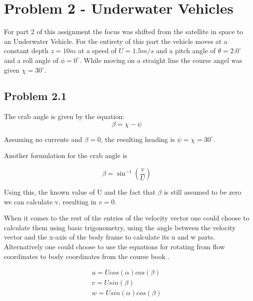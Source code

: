 \section*{Problem 2 - Underwater Vehicles}
For part 2 of this assignment the focus was shifted from the satellite in space to an Underwater Vehicle. For the entirety of this part the vehicle moves at a constant depth $z=10m$ at a speed of $U=1.5m/s$ and a pitch angle of $\theta = 2.0^\circ$ and a roll angle of $\phi = 0^\circ$. While moving on a straight line the course angel was given $\chi = 30^\circ$.
\subsection*{Problem 2.1}
The crab angle is given by the equation:
\begin{equation}
    \beta = \chi - \psi
    \label{eq:chi}
\end{equation}

Assuming no currents and $\beta = 0$, the resulting heading is $\psi = \chi = 30^\circ$.

Another formulation for the crab angle is

\begin{equation}
    \beta = \sin^{-1}(\frac{v}{U})
    \label{eq:beta_2}
\end{equation}

Using this, the known value of U and the fact that $\beta$ is still assumed to be zero we can calculate v, resulting in $v=0$.

When it comes to the rest of the entries of the velocity vector one could choose to calculate them using basic trigonometry, using the angle between the velocity vector and the x-axis of the body frame to calculate its u and w parts. Alternatively one could choose to use the equations for rotating from flow coordinates to body coordinates from the course book \cite{Fossen2011}. 

\begin{subequations}
\label{eq:vel_vect_calc}
    \begin{align}
        u = U cos(\alpha)cos(\beta) \\
        v = U sin(\beta) \\
        w = U sin(\alpha)cos(\beta)
    \end{align}
\end{subequations}

